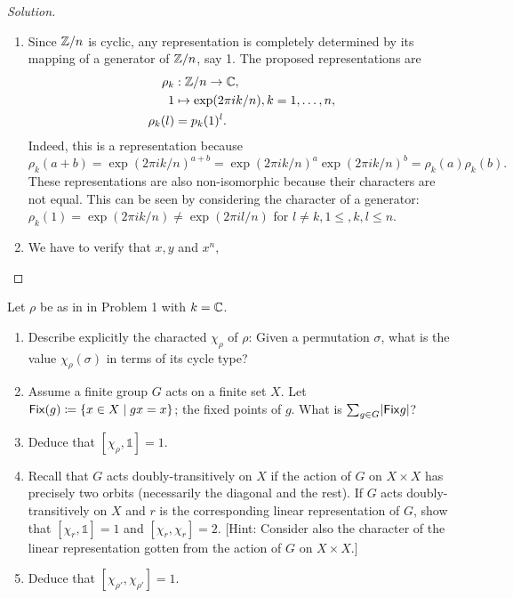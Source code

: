 \begin{proof}[Solution]
\hfill
\begin{enumerate}[font=\normalfont,label=\textbf{(\alph*)}, wide]
\item Since $\mathbb{Z}/n$ is cyclic, any representation is completely determined by its mapping of a generator of $\mathbb{Z}/n$, say 1. The proposed representations are
\[
\begin{aligned}
\rho_k &: \mathbb{Z}/n \to \mathbb{C}, \\
1 &\mapsto \exp(2\pi i k/n), k = 1, \ldots, n, \\
\rho_k(l) &= p_k(1)^l.
\end{aligned}
\]
Indeed, this is a representation because
\[
\rho_k(a + b) = \exp(2\pi i k/n)^{a+b}= \exp(2\pi i k/n)^{a} \exp(2\pi i k/n)^{b} = \rho_k(a)\rho_k(b).
\]
These representations are also non-isomorphic because their characters are not equal. This can be seen by considering the character of a generator: $\rho_k(1) = \exp(2\pi i k/n) \neq \exp(2\pi i l/n)$ for $l \neq k, 1 \leq, k, l \leq n$.

\item We have to verify that $x, y$ and $x^n, $
\end{enumerate}
\end{proof}

\newpage



\begin{problem}
Let $\rho$ be as in in Problem 1 with $k = \mathbb{C}$.
\begin{enumerate}[font=\normalfont,label=\textbf{(\alph*)}]

\item Describe explicitly the characted $\chi_\rho$ of $\rho$: Given a permutation $\sigma$, what is the value $\chi_\rho(\sigma)$ in terms of its cycle type?

\item Assume a finite group $G$ acts on a finite set $X$. Let $\mathsf{Fix} (g) \coloneqq \{x\in X\mid gx = x\}$; the fixed points of $g$. What is $\sum_{g\in G}\lvert \mathsf{Fix}{g}\rvert$?

\item Deduce that $[\chi_\rho, \mathbb{1}] = 1$.
\item Recall that $G$ acts doubly-transitively on $X$ if the action of $G$ on $X \times X$ has precisely two orbits (necessarily the diagonal and the rest). If $G$ acts doubly-transitively on $X$ and $r$ is the corresponding linear representation of $G$, show that $[\chi_r, \mathbb{1}] = 1 $ and $[\chi_r, \chi_r] = 2$. [Hint: Consider also the character of the linear representation gotten from the action of $G$ on $X\times X$.]

\item Deduce that $[\chi_{\rho'}, \chi_{\rho'}] =1$.
\end{enumerate}
\end{problem}


